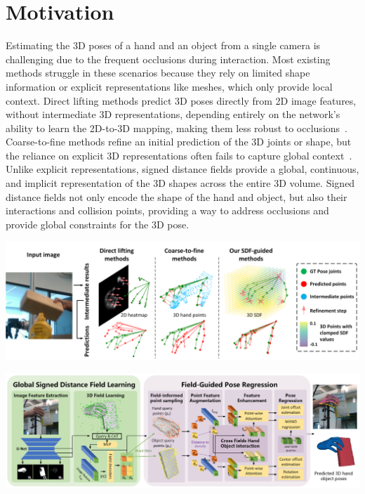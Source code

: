 \documentclass{article}
\begin{document}
\section*{Motivation}

Estimating the 3D poses of a hand and an object from a single camera is challenging due to the frequent occlusions during interaction. Most existing methods struggle in these scenarios because they rely on limited shape information or explicit representations like meshes, which only provide local context. Direct lifting methods predict 3D poses directly from 2D image features, without intermediate 3D representations, depending entirely on the network's ability to learn the 2D-to-3D mapping, making them less robust to occlusions~\cite{kang2024egotap}. Coarse-to-fine methods refine an initial prediction of the 3D joints or shape, but the reliance on explicit 3D representations often fails to capture global context~\cite{cheng2024handdiff}. Unlike explicit representations, signed distance fields provide a global, continuous, and implicit representation of the 3D shapes across the entire 3D volume. Signed distance fields not only encode the shape of the hand and object, but also their interactions and collision points, providing a way to address occlusions and provide global constraints for the 3D pose.

\begin{center}
    \includegraphics[scale=0.4]{hoisdf-2.png}
\end{center}

\begin{center}
    \includegraphics[scale=0.4]{hoisdf-3.png}
\end{center}
\end{document}
